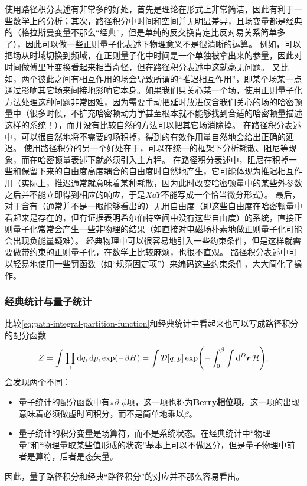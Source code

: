 \documentclass[hyperref, UTF8, a4paper]{ctexart}
\newcommand*{\fd}[1]{\mathcal{D}{#1}}
\begin{document}
使用路径积分表述有非常多的好处，首先是理论在形式上非常简洁，因此有利于一些数学上的分析；其次，路径积分中时间和空间并无明显差异，且场变量都是经典的（格拉斯曼变量不那么“经典”，但是单纯的反交换肯定比反对易关系简单多了），因此可以做一些正则量子化表述下物理意义不是很清晰的运算。
例如，可以把场从时域切换到频域，在正则量子化中时间是一个单独被拿出来的参量，因此对时间做傅里叶变换看起来相当奇怪，但在路径积分表述中这就毫无问题。
又比如，两个彼此之间有相互作用的场会导致所谓的“推迟相互作用”，即某个场某一点通过影响其它场来间接地影响它本身。如果我们只关心某一个场，使用正则量子化方法处理这种问题非常困难，因为需要手动把延时放进仅含我们关心的场的哈密顿量中（很多时候，不扩充哈密顿动力学甚至根本就不能够找到合适的哈密顿量描述这样的系统！），而并没有比较自然的方法可以把其它场消除掉。
在路径积分表述中，可以很自然地将不需要的场积掉，得到的有效作用量自然地会给出正确的延迟。
使用路径积分的另一个好处在于，可以在统一的框架下分析耗散、阻尼等现象，而在哈密顿量表述下就必须引入主方程。
在路径积分表述中，阻尼在积掉一些和保留下来的自由度高度耦合的自由度时自然地产生，它可能体现为推迟相互作用（实际上，推迟通常就意味着某种耗散，因为此时改变哈密顿量中的某些外参数之后并不能立即得到相应的响应，于是$X \dd{Y}$不能写成一个恰当微分形式）。
最后，对于含有（通常并不是一眼能够看出的）无用自由度（即这些自由度在哈密顿量中看起来是存在的，但有证据表明希尔伯特空间中没有这些自由度）的系统，直接正则量子化常常会产生一些非物理的结果（如直接对电磁场朴素地做正则量子化可能会出现负能量疑难）。
经典物理中可以很容易地引入一些约束条件，但是这样就需要做带约束的正则量子化，在数学上比较麻烦，也很不直观。
路径积分表述中可以轻易地使用一些罚函数（如“规范固定项”）来编码这些约束条件，大大简化了操作。

\subsubsection{经典统计与量子统计}

比较\eqref{eq:path-integral-partition-function}和经典统计中看起来也可以写成路径积分的配分函数
\[
    Z = \int \prod_i \dd{q_i} \dd{p_i} \exp(-\beta H) = \int \fd{[q, p]} \exp(-\int_0^\beta \int \dd[D]{\vb*{r}} \mathcal{H}),
\]
会发现两个不同：
\begin{itemize}
    \item 量子统计的配分函数中有$\pi \partial_\tau \phi$项，这一项也称为\textbf{Berry相位项}。这一项的出现意味着必须做虚时间积分，而不是简单地乘以$\beta$。
    \item 量子统计的积分变量是场算符，而不是系统状态。在经典统计中“物理量”和“物理量取某些值形成的状态”基本上可以不做区分，但是量子物理中前者是算符，后者是态矢量。
\end{itemize}
因此，量子路径积分和经典“路径积分”的对应并不那么容易看出。
\end{document}
